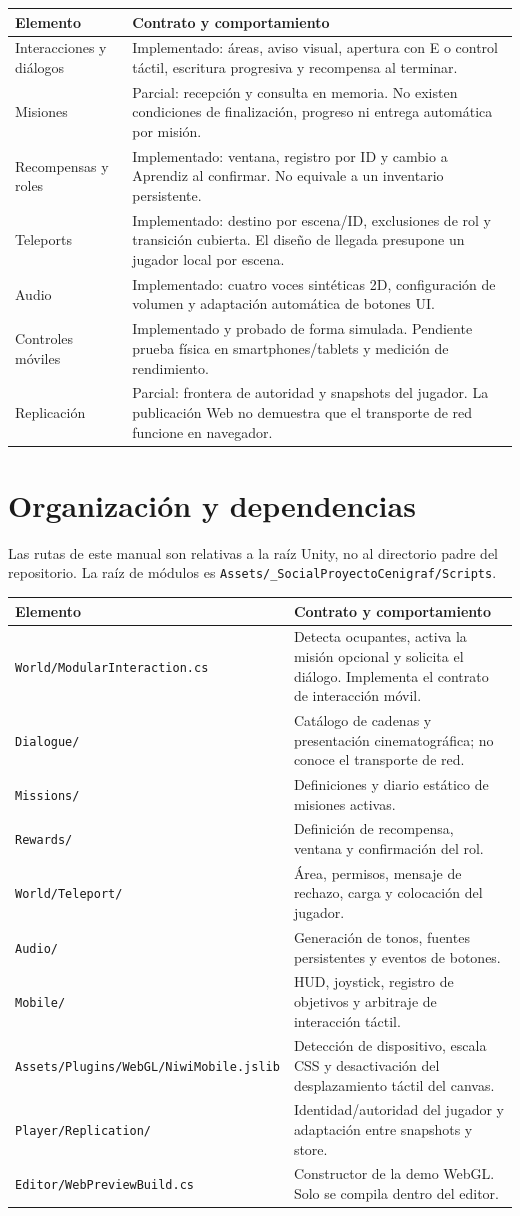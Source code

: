 \documentclass[11pt,letterpaper,oneside]{article}
\makeatletter
\newcommand{\code}[1]{\nolinkurl{#1}}
\newenvironment{spec}{\begingroup\small\begin{longtable}{@{}>{\raggedright\arraybackslash}p{0.32\textwidth}>{\raggedright\arraybackslash}p{0.64\textwidth}@{}}\toprule\textbf{Elemento} & \textbf{Contrato y comportamiento} \\ \midrule\endhead}{\bottomrule\end{longtable}\endgroup}
\makeatother
\begin{document}
\begin{spec}
Interacciones y diálogos & Implementado: áreas, aviso visual, apertura con E o control táctil, escritura progresiva y recompensa al terminar. \\
Misiones & Parcial: recepción y consulta en memoria. No existen condiciones de finalización, progreso ni entrega automática por misión. \\
Recompensas y roles & Implementado: ventana, registro por ID y cambio a Aprendiz al confirmar. No equivale a un inventario persistente. \\
Teleports & Implementado: destino por escena/ID, exclusiones de rol y transición cubierta. El diseño de llegada presupone un jugador local por escena. \\
Audio & Implementado: cuatro voces sintéticas 2D, configuración de volumen y adaptación automática de botones UI. \\
Controles móviles & Implementado y probado de forma simulada. Pendiente prueba física en smartphones/tablets y medición de rendimiento. \\
Replicación & Parcial: frontera de autoridad y snapshots del jugador. La publicación Web no demuestra que el transporte de red funcione en navegador. \\
\end{spec}

\section{Organización y dependencias}
Las rutas de este manual son relativas a la raíz Unity, no al directorio padre del repositorio. La raíz de módulos es \code{Assets/_SocialProyectoCenigraf/Scripts}.

\begin{spec}
\code{World/ModularInteraction.cs} & Detecta ocupantes, activa la misión opcional y solicita el diálogo. Implementa el contrato de interacción móvil. \\
\code{Dialogue/} & Catálogo de cadenas y presentación cinematográfica; no conoce el transporte de red. \\
\code{Missions/} & Definiciones y diario estático de misiones activas. \\
\code{Rewards/} & Definición de recompensa, ventana y confirmación del rol. \\
\code{World/Teleport/} & Área, permisos, mensaje de rechazo, carga y colocación del jugador. \\
\code{Audio/} & Generación de tonos, fuentes persistentes y eventos de botones. \\
\code{Mobile/} & HUD, joystick, registro de objetivos y arbitraje de interacción táctil. \\
\code{Assets/Plugins/WebGL/NiwiMobile.jslib} & Detección de dispositivo, escala CSS y desactivación del desplazamiento táctil del canvas. \\
\code{Player/Replication/} & Identidad/autoridad del jugador y adaptación entre snapshots y store. \\
\code{Editor/WebPreviewBuild.cs} & Constructor de la demo WebGL. Solo se compila dentro del editor. \\
\end{spec}
\end{document}
